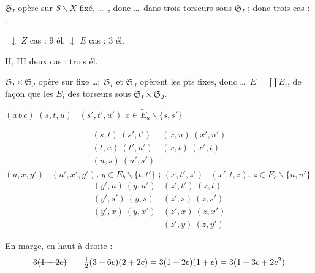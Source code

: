 \documentclass[11pt,a4paper]{article}
\begin{document}
$\mathfrak{S}_I$ opère sur $S \smallsetminus X$ \ill{} fixé,  \ldots\ , donc \ldots\ dans trois torseurs sous $\mathfrak{S}_I$ ; donc trois cas : \ill{}.

 \ $\downarrow$ \quad $Z$ cas : $9$ él. \quad $\downarrow$ \quad $E$ cas : $3$ él.


II, III \quad deux cas : trois él.

$\mathfrak{S}_I \times \mathfrak{S}_J$ opère sur \ill{} \struck{\ill{}} fixe \ldots ; $\mathfrak{S}_I$ et $\mathfrak{S}_J$ opèrent  les pts fixes, donc \ldots\ $E = \coprod E_i$, de façon que les $E_i$  des torseurs sous $\mathfrak{S}_I \times \mathfrak{S}_J$.


$(a\,b\,c)$ \qquad {} \qquad $(s,t,u)$ \ $(s',t',u')$ \qquad $x \in \widetilde{E}_a \smallsetminus \{s,s'\}$

\[
\begin{array}{ll}
(s,t)\ (s',t') & (x,u)\ (x',u') \\
(t,u)\ (t',u') & (x,t)\ (x',t) \\
(u,s)\ (u',s') &
\end{array}
\]
$(u,x,y')$ \ $(u',x',y')$, \quad $y \in \widetilde{E}_b \smallsetminus \{t,t'\}$ ; \qquad
$(x,t',z')$ \ $(x',t,z)$, \quad $z \in \widetilde{E}_c \smallsetminus \{u,u'\}$
\[
\begin{array}{ll}
(y',u)\ (y,u') & (z',t')\ (z,t) \\
(y',s')\ (y,s) & (z',s)\ (z,s') \\
(y',x)\ (y,x') & (z',x)\ (z,x') \\
 & (z',y)\ (z,y')
\end{array}
\]

En marge, en haut à droite :
\[
\text{\struck{$3(1+2c)$}} \qquad \tfrac12(3+6c)(2+2c) = 3(1+2c)(1+c) = 3(1+3c+2c^2)
\]

\end{document}
